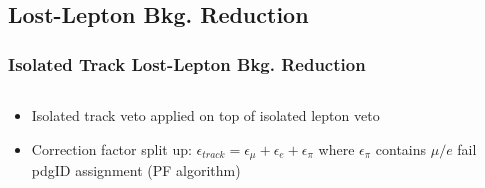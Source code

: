 \documentclass{beamer}
\begin{document}
\subsection{Lost-Lepton Bkg. Reduction}
\begin{frame}
\frametitle{Isolated Track Lost-Lepton Bkg. Reduction}

  \begin{columns}
 \begin{column}{0.50\textwidth}
   \begin{itemize}
  \item Isolated track veto applied on top of isolated lepton veto
  \item Correction factor split up: $\epsilon_{track} = \epsilon_{\mu} +\epsilon_{e} +\epsilon_{\pi} $ where $\epsilon_{\pi}$ contains $\mu/e$ fail pdgID assignment (PF algorithm)
 \end{itemize}
 \end{column}
  \begin{column}{0.50\textwidth}
\end{column}
\end{columns}
\end{frame}
\end{document}
